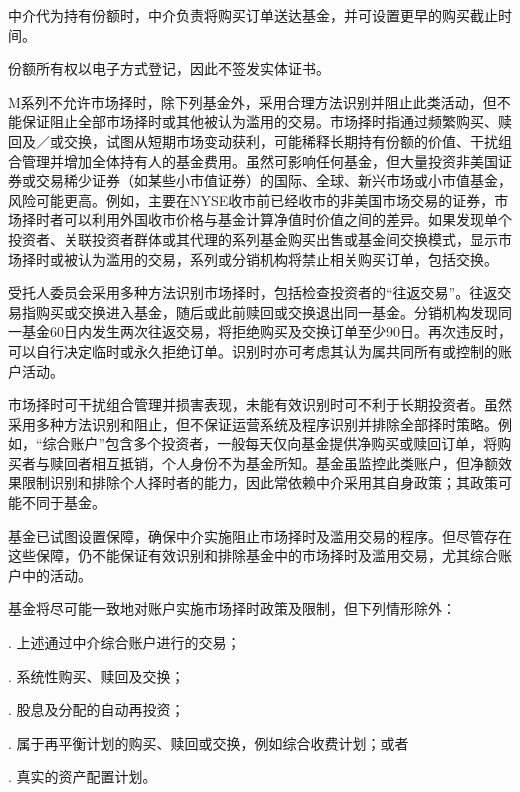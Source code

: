 \documentclass[UTF8,fontset=none,11pt,a4paper]{ctexart}
\begin{document}
中介代为持有份额时，中介负责将购买订单送达基金，并可设置更早的购买\allowbreak\mbox{截止时间。}

份额所有权以电子方式登记，因此不签发\allowbreak\mbox{实体证书。}

M系列不允许市场择时，除下列基金外，采用合理方法识别并阻止此类活动，但不能保证阻止全部市场择时或其他被认为滥用的交易。市场择时指通过频繁购买、赎回及／或交换，试图从短期市场变动获利，可能稀释长期持有份额的价值、干扰组合管理并增加全体持有人的基金费用。虽然可影响任何基金，但大量投资非美国证券或交易稀少证券（如某些小市值证券）的国际、全球、新兴市场或小市值基金，风险可能更高。例如，主要在NYSE收市前已经收市的非美国市场交易的证券，市场择时者可以利用外国收市价格与基金计算净值时价值之间的差异。如果发现单个投资者、关联投资者群体或其代理的系列基金购买出售或基金间交换模式，显示市场择时或被认为滥用的交易，系列或分销机构将禁止相关购买订单，\allowbreak\mbox{包括交换。}


\par{}\label{originalpage9}
受托人委员会采用多种方法识别市场择时，包括检查投资者的“往返交易”。往返交易指购买或交换进入基金，随后或此前赎回或交换退出同一基金。分销机构发现同一基金60日内发生两次往返交易，将拒绝购买及交换订单至少90日。再次违反时，可以自行决定临时或永久拒绝订单。识别时亦可考虑其认为属共同所有或控制的\allowbreak\mbox{账户活动。}

市场择时可干扰组合管理并损害表现，未能有效识别时可不利于长期投资者。虽然采用多种方法识别和阻止，但不保证运营系统及程序识别并排除全部择时策略。例如，“综合账户”包含多个投资者，一般每天仅向基金提供净购买或赎回订单，将购买者与赎回者相互抵销，个人身份不为基金所知。基金虽监控此类账户，但净额效果限制识别和排除个人择时者的能力，因此常依赖中介采用其自身政策；其政策可能不\allowbreak\mbox{同于基金。}

基金已试图设置保障，确保中介实施阻止市场择时及滥用交易的程序。但尽管存在这些保障，仍不能保证有效识别和排除基金中的市场择时及滥用交易，尤其综合账户\allowbreak\mbox{中的活动。}

基金将尽可能一致地对账户实施市场择时政策及限制，但下列\allowbreak\mbox{情形除外：}

. 上述通过中介综合账户进\allowbreak\mbox{行的交易；}


. 系统性购买、赎\allowbreak\mbox{回及交换；}


. 股息及分配的自\allowbreak\mbox{动再投资；}


. 属于再平衡计划的购买、赎回或交换，例如综合收费计划；或者


. 真实的资产\allowbreak\mbox{配置计划。}
\end{document}
